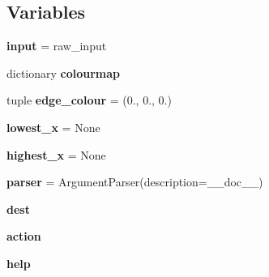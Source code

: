 \subsection*{Variables}
\begin{DoxyCompactItemize}
\item 
\mbox{\label{namespacepymavlink_1_1tools_1_1mavgraph_a928b14ed776682a5ebb2771542b9a0a1}} 
{\bfseries input} = raw\+\_\+input
\item 
dictionary {\bfseries colourmap}
\item 
\mbox{\label{namespacepymavlink_1_1tools_1_1mavgraph_ac366aacb234e65fd78591f016c14244b}} 
tuple {\bfseries edge\+\_\+colour} = (0., 0., 0.)
\item 
\mbox{\label{namespacepymavlink_1_1tools_1_1mavgraph_ab5584d0ed00cdabd2f2e398a6f2fa6cb}} 
{\bfseries lowest\+\_\+x} = None
\item 
\mbox{\label{namespacepymavlink_1_1tools_1_1mavgraph_acdf25cf5ff7a6fe89275cc858098e27d}} 
{\bfseries highest\+\_\+x} = None
\item 
\mbox{\label{namespacepymavlink_1_1tools_1_1mavgraph_aaebc1136de1737f5e2385c24b0116c80}} 
{\bfseries parser} = Argument\+Parser(description=\+\_\+\+\_\+doc\+\_\+\+\_\+)
\item 
\mbox{\label{namespacepymavlink_1_1tools_1_1mavgraph_aa2933b10f61d19dae3edec777bace1e5}} 
{\bfseries dest}
\item 
\mbox{\label{namespacepymavlink_1_1tools_1_1mavgraph_a58d1e749cdfd32e32c96b12b41232328}} 
{\bfseries action}
\item 
\mbox{\label{namespacepymavlink_1_1tools_1_1mavgraph_a2803f5f3d58334e8a302d3a994334ca9}} 
{\bfseries help}
\item 
\mbox{\label{namespacepymavlink_1_1tools_1_1mavgraph_a67fc7dad2e637dbf68216f8a90eae782}} 

\end{DoxyCompactItemize}

